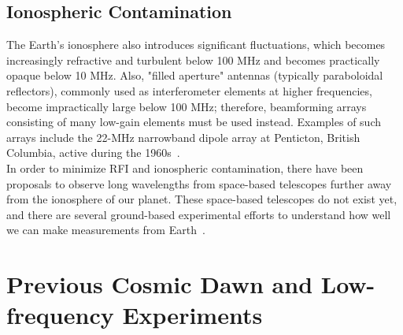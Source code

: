 \documentclass[12pt,a4paper]{report}
\begin{document}
	\subsection*{Ionospheric Contamination}
	
	The Earth's ionosphere also introduces significant fluctuations, which becomes increasingly refractive and turbulent below 100 MHz and becomes practically opaque below 10 MHz. Also, "filled aperture" antennas (typically paraboloidal reflectors), commonly used as interferometer elements at higher frequencies, become impractically large below 100 MHz; therefore, beamforming arrays consisting of many low-gain elements must be used instead. Examples of such arrays include the 22-MHz narrowband dipole array at Penticton, British Columbia, active during the 1960s~\citep{2005ITAP...53.2480E}.\\
	
	
	In order to minimize RFI and ionospheric contamination, there have been proposals to observe long wavelengths from space-based telescopes further away from the ionosphere of our planet. These space-based telescopes do not exist yet, and there are several ground-based experimental efforts to understand how well we can make measurements from Earth~\citep{2016ExA....41..271R}. \\
	
	

	\section{Previous Cosmic Dawn and Low-frequency Experiments}
	
	
\end{document}
